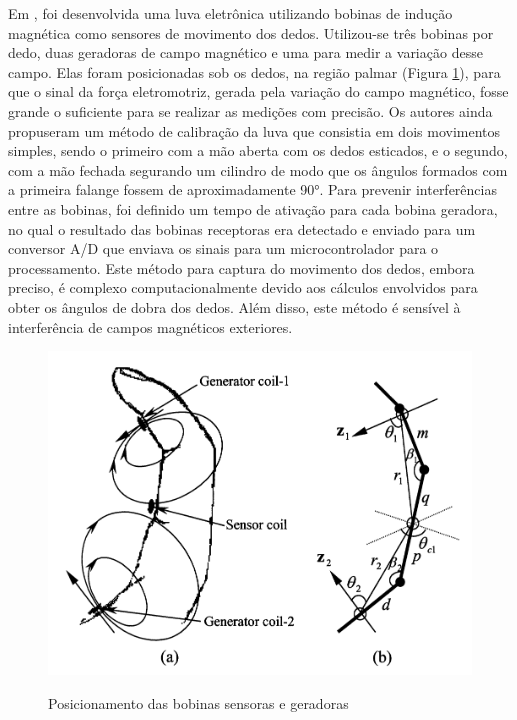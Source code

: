 Em , foi desenvolvida uma luva eletrônica utilizando bobinas de indução magnética como sensores de movimento dos dedos. Utilizou-se três bobinas por dedo, duas geradoras de campo magnético e uma para medir a variação desse campo. Elas foram posicionadas sob os dedos, na região palmar (Figura \ref{fig:magneto}), para que o sinal da força eletromotriz, gerada pela variação do campo magnético, fosse grande o suficiente para se realizar as medições com precisão. Os autores ainda propuseram um método de calibração da luva que consistia em dois movimentos simples, sendo o primeiro com a mão aberta com os dedos esticados, e o segundo, com a mão fechada segurando um cilindro de modo que os ângulos formados com a primeira falange fossem de aproximadamente \ang{90}. Para prevenir interferências entre as bobinas, foi definido um tempo de ativação para cada bobina geradora, no qual o resultado das bobinas receptoras era detectado e enviado para um conversor \ac{A/D} que enviava os sinais para um microcontrolador para o processamento. Este método para captura do movimento dos dedos, embora preciso, é complexo computacionalmente devido aos cálculos envolvidos para obter os ângulos de dobra dos dedos. Além disso, este método é sensível à interferência de campos magnéticos exteriores.

\begin{figure}[H]
  \setlength{\abovecaptionskip}{0pt}
  \setlength{\belowcaptionskip}{0pt}
  \caption[Posicionamento das bobinas sensoras e geradoras]{Posicionamento das bobinas sensoras e geradoras}
  \centering
  \includegraphics[width=.5\textwidth]{imagem/2005magneto}
  \captionsetup{justification=centering}
  \label{fig:magneto}
\end{figure}


